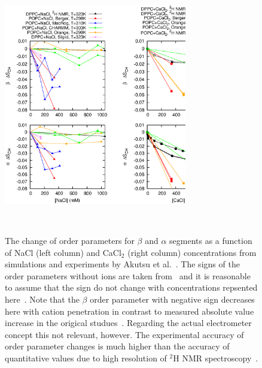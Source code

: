 \documentclass[pre,aps,floatfix,authordate1-4,twocolumn]{revtex4-1}
\begin{document}
\begin{figure}[]
  \centering
  \includegraphics[width=8cm]{../Fig/OrderParameterIONSchanges.eps}
  \caption{\label{ordPions}
    The change of order parameters for $\beta$ and $\alpha$ segments as a function of NaCl (left column) and CaCl$_2$ (right column) concentrations from simulations 
    and experiments by Akutsu et al.~\cite{akutsu81}. The signs of the order parameters without ions are taken from~\cite{hong95a,hong95b,gross97} and it is reasonable
    to assume that the sign do not change with concentrations repsented here~\cite{altenbach84}. Note that the $\beta$ order parameter with negative sign decreases here with cation
    penetration in contrast to measured absolute value increase in the origical studues~\cite{akutsu81,altenbach84}.
    Regarding the actual electrometer concept this not relevant, however. 
    The experimental accuracy of order parameter changes is much higher than the accuracy of quantitative values due to high resolution of $^2$H NMR spectroscopy~\cite{??}. 
   }
 \\

\end{figure}
\end{document}
